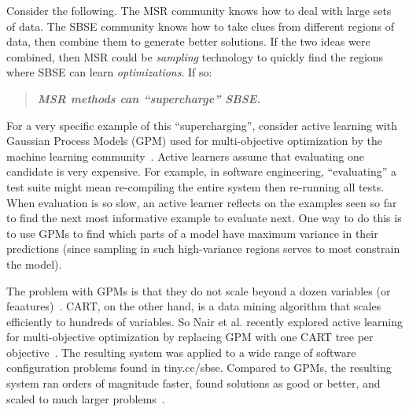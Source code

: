 \documentclass[sigconf,anonymous,review]{acmart}
\begin{document}



Consider the following. The MSR
community knows how to deal with large sets of data. The SBSE community knows how to take
clues from different regions of data, then combine them to generate better solutions.
If the two ideas were combined, then  MSR could be  {\em sampling} technology to quickly
find the regions where SBSE  can learn {\em  optimizations}. If so:
\begin{quote}
\centering
{\bf {\em   MSR  methods can ``supercharge''    SBSE.}}
\end{quote}
For a very specific example of this ``supercharging'', consider active learning
with Gaussian Process Models (GPM) used for multi-objective optimization
by the machine learning community~\cite{zuluaga2016varepsilon}.  Active learners assume that evaluating one candidate
is very expensive. For example, in software engineering, ``evaluating'' a test suite
might mean re-compiling
the entire system then re-running all tests. When evaluation is so slow,
an active learner reflects on the examples seen so far to find the next most informative
example to evaluate next. One way to do this is to use GPMs  to
find which parts of a model have maximum variance in their predictions 
(since sampling
in such high-variance regions serves to most constrain the model).  

The problem with GPMs is that they do not scale beyond a dozen variables (or feaatures)~\cite{wang2016bayesian}. CART, on the other hand, is a data mining algorithm that scales efficiently
to hundreds of variables. So Nair et al. recently explored  
 active learning  for multi-objective optimization by replacing GPM with one CART tree per objective~\cite{nair2018finding}.
 The resulting system was applied to a wide range of software configuration problems
 found in tiny.cc/sbse.
 Compared to GPMs, the resulting system ran orders of magnitude faster, found solutions
 as good or better, and  scaled to much larger problems~\cite{nair2018finding}. 
\end{document}
